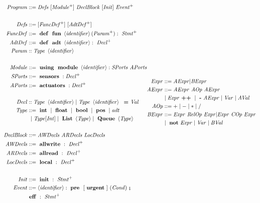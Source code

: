 \begin{figure}[H]
\scriptsize
\begin{align*}
\begin{split}
\pgm &::= \defs\ [\im]\ \db\ [\init]\ \evnts\  \\\\
\defs &::= [\fdefs^+]\ [\adefs^+]\\
\fdefs &::= \mterm{def}\mterm{fun} \id ( \params ):\ \stmts\\  
\adefs &::= \mterm{def}\mterm{adt} \id :\ \decls\\
\param &:: \type\ \id \\\\
\mathit{Module} &::= \mterm{using}\mterm{module}\id : \sports\ \aports\\
\sports &::= \mterm{sensors}:\decls \\ 
\aports &::= \mterm{actuators}:\decls\\\\
\decl &:: \type\ \id \mid \type\ \id \ \mterm{=} \val \\
\type &::= \mterm{int}\mid \mterm{float}\mid\mterm{bool}\mid \mterm{pos}\mid \mathit{adt} \\ &\ \mid \type [\mathit{Int}]\mid \mterm{List}\left\langle\type\right\rangle \mid \mterm{Queue}\left\langle\type\right\rangle\\\\
\db &::= \awd\ \ard\ \ld\\
\awd &::= \mterm{allwrite}:\ \decls\\ 
\ard &::= \mterm{allread}:\ \decls\\ 
\ld &::= \mterm{local}:\ \decls\\\\
\init &::= \mterm{init}:\ \stmts\\
\evnt &::= \id: \mterm{pre}\ [\mterm{urgent}]\ (\cnd)\mterm{;} \\ 
	& \mterm{eff}:\ \stmts\\
\end{split}\begin{split}
\expr &::= \aexpr | \bexpr \\
\aexpr &::= \aexpr\ \mathit{AOp}\ \aexpr\\  
&\mid \expr \mterm{++} \mid \mterm{-} \aexpr \mid \var \mid \aval \\
\mathit{AOp} &::= +\mid-\mid*\mid / \\ 
\bexpr &::=  \expr\ \mathit{RelOp}\ \expr | \expr\ \mathit{COp}\ \expr\\
&\mid \mterm{not} \expr \mid \var\mid \bval\\

\end{split}
\end{align*}
\end{figure}
